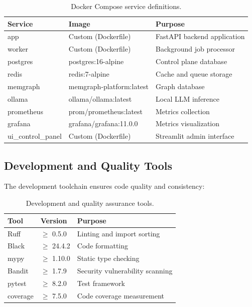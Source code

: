 \begin{table}[ht]
\centering
\caption{Docker Compose service definitions.}
\label{tab:docker-services}
\small
\begin{tabular}{llp{6cm}}
\hline
\textbf{Service} & \textbf{Image} & \textbf{Purpose} \\
\hline
app & Custom (Dockerfile) & FastAPI backend application \\
worker & Custom (Dockerfile) & Background job processor \\
postgres & postgres:16-alpine & Control plane database \\
redis & redis:7-alpine & Cache and queue storage \\
memgraph & memgraph-platform:latest & Graph database \\
ollama & ollama/ollama:latest & Local LLM inference \\
prometheus & prom/prometheus:latest & Metrics collection \\
grafana & grafana/grafana:11.0.0 & Metrics visualization \\
ui\_control\_panel & Custom (Dockerfile) & Streamlit admin interface \\
\hline
\end{tabular}
\end{table}

\subsection{Development and Quality Tools}

The development toolchain ensures code quality and consistency:

\begin{table}[ht]
\centering
\caption{Development and quality assurance tools.}
\label{tab:dev-tools}
\small
\begin{tabular}{lll}
\hline
\textbf{Tool} & \textbf{Version} & \textbf{Purpose} \\
\hline
Ruff & $\geq$ 0.5.0 & Linting and import sorting \\
Black & $\geq$ 24.4.2 & Code formatting \\
mypy & $\geq$ 1.10.0 & Static type checking \\
Bandit & $\geq$ 1.7.9 & Security vulnerability scanning \\
pytest & $\geq$ 8.2.0 & Test framework \\
coverage & $\geq$ 7.5.0 & Code coverage measurement \\
\hline
\end{tabular}
\end{table}


